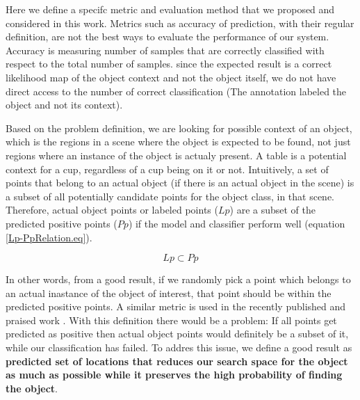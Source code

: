 
Here we define a specifc metric and evaluation method that we proposed and considered in this work.
Metrics such as accuracy of prediction, with their regular definition, are not the best ways to evaluate the performance of our system.
Accuracy is measuring number of samples that are correctly classified with respect to the total number of samples.
since the expected result is a correct likelihood map of the object context and not the object itself, we do not have direct access to the number of correct classification (The annotation labeled the object and not its context). 

Based on the problem definition, we are looking for possible context of an object, which is the regions in a scene where the 
object is expected to be found, not just regions where an instance of the object is actualy present. A table is a potential context for a cup, regardless of a cup being on it or not.   
Intuitively, a set of points that belong to an actual object (if there is an actual object in the scene) is a subset of all 
potentially candidate points for the object class, in that scene.
Therefore, actual object points or labeled points ($Lp$) are a subset of the predicted positive points ($Pp$) if the model and classifier perform 
well (equation \ref{Lp-PpRelation.eq}).

\begin{equation}
 \label{Lp-PpRelation.eq}
 Lp \subset Pp
\end{equation}

In other words, from a good result, if we randomly pick a point which belongs to an actual inastance of the object of interest, that point should be within the predicted positive points. A similar metric is used in the recently published and praised work \cite{aydemir2012_3Dcontext}.
With this definition there would be a problem: If all points get predicted as positive then actual object points would 
definitely be a subset of it, while our classification has failed.
To addres this issue, we define a good result as \textbf {predicted set of locations that reduces our search space for the object as much as 
possible while it preserves the high probability of finding the object}.

